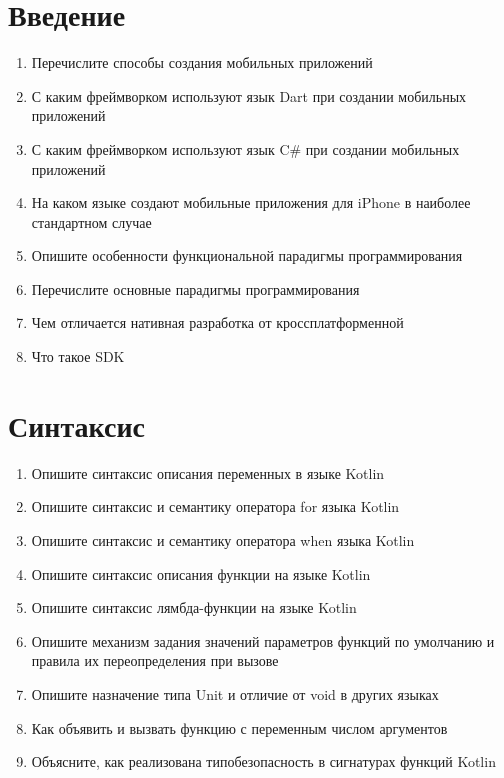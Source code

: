 \documentclass[12pt]{article}
\begin{document}
\section*{Введение}
\begin{enumerate}
  \item Перечислите способы создания мобильных приложений
  \item С каким фреймворком используют язык Dart при создании мобильных приложений
  \item С каким фреймворком используют язык C\# при создании мобильных приложений
  \item На каком языке создают мобильные приложения для iPhone в наиболее стандартном случае
  \item Опишите особенности функциональной парадигмы программирования
  \item Перечислите основные парадигмы программирования
  \item Чем отличается нативная разработка от кроссплатформенной
  \item Что такое SDK
\end{enumerate}

\section*{Синтаксис}
\begin{enumerate}
  \item Опишите синтаксис описания переменных в языке Kotlin
  \item Опишите синтаксис и семантику оператора for языка Kotlin
  \item Опишите синтаксис и семантику оператора when языка Kotlin
  \item Опишите синтаксис описания функции на языке Kotlin
  \item Опишите синтаксис лямбда-функции на языке Kotlin
  \item Опишите механизм задания значений параметров функций по умолчанию и правила их переопределения при вызове
  \item Опишите назначение типа Unit и отличие от void в других языках
  \item Как объявить и вызвать функцию с переменным числом аргументов
  \item Объясните, как реализована типобезопасность в сигнатурах функций Kotlin
\end{enumerate}
\end{document}
